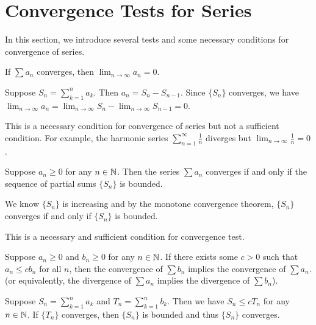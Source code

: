     \section{Convergence Tests for Series}
    In this section, we introduce several tests and some necessary conditions for convergence of series.
    \begin{theoremenv}
        If $\sum a_n$ converges, then $\displaystyle \lim_{n\to \infty} a_n = 0$.
    \end{theoremenv}
    \begin{proofenv}
        Suppose $\displaystyle S_n = \sum_{k=1}^n a_k$. Then $a_n = S_n - S_{n-1}$. Since $\{S_n\}$ converges, we have $\displaystyle \lim_{n\to \infty} a_n = \displaystyle \lim_{n\to \infty} S_n - \displaystyle \lim_{n\to \infty} S_{n-1} = 0$.
    \end{proofenv}
    \begin{remarkenv}
        This is a necessary condition for convergence of series but not a sufficient condition. For example, the harmonic series $\displaystyle \sum_{n=1}^\infty \frac{1}{n}$ diverges but $\displaystyle \lim_{n\to \infty} \frac{1}{n} = 0$.
    \end{remarkenv}
    \begin{theoremenv}
        Suppose $a_n \ge 0$ for any $n\in \mathbb{N}$. Then the series $\sum a_n$ converges if and only if the sequence of partial sums $\{S_n\}$ is bounded.
    \end{theoremenv}
    \begin{proofenv}
        We know $\{S_n\} $ is increasing and by the monotone convergence theorem, $\{S_n\}$ converges if and only if $\{S_n\}$ is bounded.
    \end{proofenv}
    \begin{remarkenv}
        This is a necessary and sufficient condition for convergence test.
    \end{remarkenv}
    \begin{theoremenv}
        Suppose $a_n\ge 0$ and $b_n\ge 0$ for any $n\in \mathbb{N}$. If there exists some $c>0$ such that $a_n \le c b_n$ for all $n$, then the convergence of $\sum b_n$ implies the convergence of $\sum a_n$. (or equivalently, the divergence of $\sum a_n$ implies the divergence of $\sum b_n$).
        
        
    \end{theoremenv}
    \begin{proofenv}
        Suppose $\displaystyle S_n = \sum_{k=1}^n a_k$ and $\displaystyle T_n = \sum_{k=1}^n b_k$. Then we have $S_n \le c T_n$ for any $n\in \mathbb{N}$. If $\{T_n\}$ converges, then $\{S_n\}$ is bounded and thus $\{S_n\}$ converges.
    \end{proofenv}
